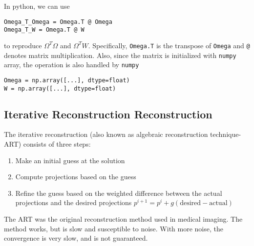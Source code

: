 \documentclass[../../../main.tex]{subfiles}
\begin{document}
In python, we can use
\begin{verbatim}
Omega_T_Omega = Omega.T @ Omega
Omega_T_W = Omega.T @ W
\end{verbatim}
to reproduce $\Omega^T \Omega$ and $\Omega^T W$.
Specifically, \verb|Omega.T| is the transpose of \verb|Omega| and \verb|@| denotes matrix multiplication.
Also, since the matrix is initialized with \verb|numpy| array, the operation is also handled by \verb|numpy|
\begin{verbatim}
Omega = np.array([...], dtype=float)
W = np.array([...], dtype=float)
\end{verbatim}

\subsection{Iterative Reconstruction Reconstruction}
The iterative reconstruction (also known as algebraic reconstruction technique-ART) consists of three steps:
\begin{enumerate}
    \item Make an initial guess at the solution
    \item Compute projections based on the guess
    \item Refine the guess based on the weighted difference between the actual projections and the desired projections $p^{i+1}=p^i+g(\text{desired}-\text{actual})$
\end{enumerate}
The ART was the original reconstruction method used in medical imaging.
The method works, but is slow and susceptible to noise. With more noise, the convergence is very slow, and is not guaranteed.
\end{document}
